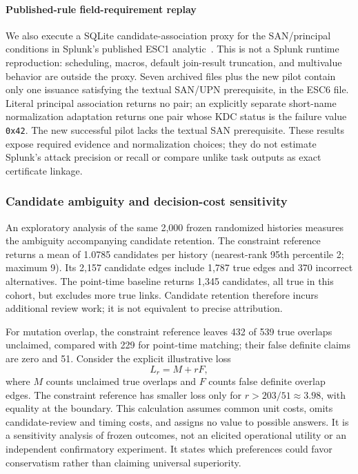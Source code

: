 \paragraph{Published-rule field-requirement replay}
We also execute a SQLite candidate-association proxy for the SAN/principal conditions in Splunk's published ESC1 analytic~\cite{splunk2026esc1}. This is not a Splunk runtime reproduction: scheduling, macros, default join-result truncation, and multivalue behavior are outside the proxy. Seven archived files plus the new pilot contain only one issuance satisfying the textual SAN/UPN prerequisite, in the ESC6 file. Literal principal association returns no pair; an explicitly separate short-name normalization adaptation returns one pair whose KDC status is the failure value \texttt{0x42}. The new successful pilot lacks the textual SAN prerequisite. These results expose required evidence and normalization choices; they do not estimate Splunk's attack precision or recall or compare unlike task outputs as exact certificate linkage.



\subsubsection{Candidate ambiguity and decision-cost sensitivity}
An exploratory analysis of the same 2,000 frozen randomized histories measures the ambiguity accompanying candidate retention. The constraint reference returns a mean of 1.0785 candidates per history (nearest-rank 95th percentile 2; maximum 9). Its 2,157 candidate edges include 1,787 true edges and 370 incorrect alternatives. The point-time baseline returns 1,345 candidates, all true in this cohort, but excludes more true links. Candidate retention therefore incurs additional review work; it is not equivalent to precise attribution.

For mutation overlap, the constraint reference leaves 432 of 539 true overlaps unclaimed, compared with 229 for point-time matching; their false definite claims are zero and 51. Consider the explicit illustrative loss
\begin{equation}
 L_r=M+rF,
\end{equation}
where $M$ counts unclaimed true overlaps and $F$ counts false definite overlap edges. The constraint reference has smaller loss only for $r>203/51\approx3.98$, with equality at the boundary. This calculation assumes common unit costs, omits candidate-review and timing costs, and assigns no value to possible answers. It is a sensitivity analysis of frozen outcomes, not an elicited operational utility or an independent confirmatory experiment. It states which preferences could favor conservatism rather than claiming universal superiority.

